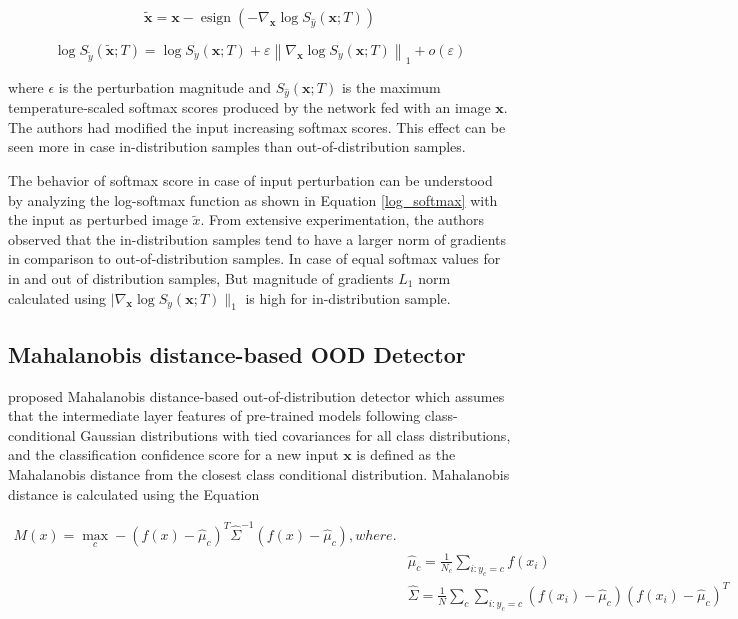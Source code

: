     \begin{equation}
        \tilde{\boldsymbol{x}}=\boldsymbol{x}-\operatorname{esign}\left(-\nabla_{\boldsymbol{x}} \log S_{\hat{y}}(\boldsymbol{x} ; T)\right)
        \label{perturbation}
    \end{equation}
    
    \begin{equation}
        \log S_{\tilde{y}}(\tilde{\boldsymbol{x}} ; T)=\log S_{\dot{y}}(\boldsymbol{x} ; T)+\varepsilon\left\|\nabla_{\boldsymbol{x}} \log S_{\dot{y}}(\boldsymbol{x} ; T)\right\|_{1}+o(\varepsilon)
        \label{log_softmax}
    \end{equation}
    
    where $\epsilon$ is the perturbation magnitude and $S_{\hat{y}}(\boldsymbol{x} ; T)$ is the maximum temperature-scaled softmax scores produced by the network fed with an image $\boldsymbol{x}$. The authors had modified the input increasing softmax scores. This effect can be seen more in case in-distribution samples than out-of-distribution samples.
    
    The behavior of softmax score in case of input perturbation can be understood by analyzing the log-softmax function as shown in Equation \ref{log_softmax} with the input as perturbed image $\tilde{x}$. From extensive experimentation, the authors observed that the in-distribution samples tend to have a larger norm of gradients in comparison to out-of-distribution samples. In case of equal softmax values for in and out of distribution samples, But magnitude of gradients $L_{1}$ norm calculated using $|\nabla_{\boldsymbol{x}} \log S_{\dot{y}}(\boldsymbol{x} ; T) \|_{1} $ is high for in-distribution sample. 
    
    \subsection{Mahalanobis distance-based OOD Detector}
    \label{MD_ood}
    \citet{Lee2018} proposed Mahalanobis distance-based out-of-distribution detector which assumes that the intermediate layer features of pre-trained models following class-conditional Gaussian distributions with tied covariances for all class distributions, and the classification confidence score for a new input $\mathbf{x}$ is defined as the Mahalanobis distance from the closest class conditional distribution. Mahalanobis distance is calculated using the Equation 
     
    \begin{equation}
        \begin{gathered}
            M(x)=\max _{c}-\left(f(x)-\hat{\mu}_{c}\right)^{T} \hat{\Sigma}^{-1}\left(f(x)-\hat{\mu}_{c}\right), where. \\
            & \hat{\mu}_{c}=\frac{1}{N_{c}} \sum_{i: y_{c}=c} f\left(x_{i}\right) \\
            & \hat{\Sigma}=\frac{1}{N} \sum_{c} \sum_{i: y_{c}=c}\left(f\left(x_{i}\right)-\hat{\mu}_{c}\right)\left(f\left(x_{i}\right)-\hat{\mu}_{c}\right)^{T} \\
        \end{gathered}
        \label{Mahalanobis_dist}
    \end{equation}
    
